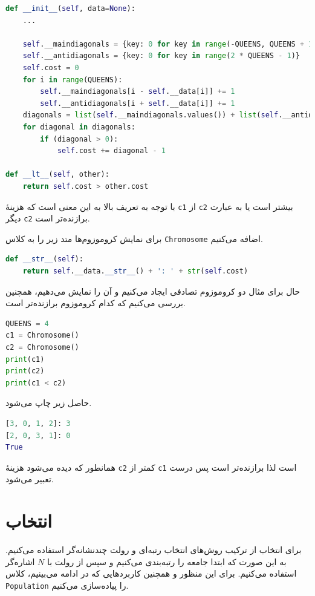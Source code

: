 \documentclass[a4paper, 12pt]{article}
\theoremstyle{definition}
\begin{document}
\LTR
\begin{lstlisting}[language=Python]
def __init__(self, data=None):
    ...

    self.__maindiagonals = {key: 0 for key in range(-QUEENS, QUEENS + 1)}
    self.__antidiagonals = {key: 0 for key in range(2 * QUEENS - 1)}
    self.cost = 0
    for i in range(QUEENS):
        self.__maindiagonals[i - self.__data[i]] += 1
        self.__antidiagonals[i + self.__data[i]] += 1
    diagonals = list(self.__maindiagonals.values()) + list(self.__antidiagonals.values())
    for diagonal in diagonals:
        if (diagonal > 0):
            self.cost += diagonal - 1

def __lt__(self, other):
    return self.cost > other.cost
\end{lstlisting}
\RTL

با توجه به تعریف بالا
به این معنی است که هزینهٔ
\texttt{c1}
از
\texttt{c2}
بیشتر است یا به عبارت دیگر
\texttt{c2}
برازنده‌تر است.

برای نمایش کروموزوم‌ها متد زیر را به کلاس
\texttt{Chromosome}
اضافه می‌کنیم.

\LTR
\begin{lstlisting}[language=Python]
def __str__(self):
    return self.__data.__str__() + ': ' + str(self.cost)
\end{lstlisting}
\RTL

حال برای مثال دو کروموزوم تصادفی ایجاد می‌کنیم و آن را نمایش می‌دهیم، همچنین بررسی می‌کنیم که کدام کروموزوم برازنده‌تر است.

\LTR
\begin{lstlisting}[language=Python]
QUEENS = 4
c1 = Chromosome()
c2 = Chromosome()
print(c1)
print(c2)
print(c1 < c2)
\end{lstlisting}
\RTL

حاصل زیر چاپ می‌شود.

\LTR
\begin{lstlisting}[language=Python]
[3, 0, 1, 2]: 3
[2, 0, 3, 1]: 0
True
\end{lstlisting}
\RTL

همانطور که دیده می‌شود هزینهٔ
\texttt{c2}
کمتر از
\texttt{c1}
است لذا برازنده‌تر است پس
درست تعبیر می‌شود.

\section{انتخاب}
برای انتخاب از ترکیب روش‌های انتخاب رتبه‌ای و رولت چندنشانه‌گر استفاده می‌کنیم. به این صورت که ابتدا جامعه را رتبه‌بندی می‌کنیم و سپس از رولت با
$N$
اشاره‌گر استفاده می‌کنیم. برای این منظور و همچنین کاربردهایی که در ادامه می‌بینیم، کلاس
\texttt{Population}
را پیاده‌سازی می‌کنیم.
\end{document}
